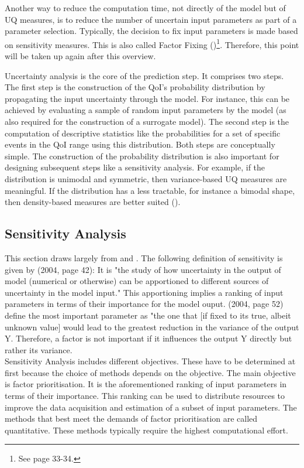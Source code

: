 \documentclass[a4paper,12pt]{article}
\begin{document}
Another way to reduce the computation time, not directly of the model but of UQ measures, is to reduce the number of uncertain input parameters as part of a parameter selection. Typically, the decision to fix input parameters is made based on sensitivity measures. This is also called Factor Fixing (\cite{Saltelli.2008})\footnote{See page 33-34.}. Therefore, this point will be taken up again after this overview.

Uncertainty analysis is the core of the prediction step. It comprises two steps. The first step is the  construction of the QoI's probability distribution by propagating the input uncertainty through the model. For instance, this can be achieved by evaluating a sample of random input parameters by the model (as also required for the construction of a surrogate model). The second step is the computation of descriptive statistics like the probabilities for a set of specific events in the QoI range using this distribution. Both steps are conceptually simple. The construction of the probability distribution is also important for designing subsequent steps like a sensitivity analysis. For example, if the distribution is unimodal and symmetric, then variance-based UQ measures are meaningful. If the distribution has a less tractable, for instance a bimodal shape, then density-based measures are better suited (\cite{plischke2013global}).


\subsection{Sensitivity Analysis}


This section draws largely from \cite{Saltelli.2004} and \cite{Saltelli.2004}.
The following definition of sensitivity is given by \citeauthor{Saltelli.2004} (2004, page 42): It is "the study of how uncertainty in the output of model (numerical or otherwise) can be apportioned to different sources of uncertainty in the model input." This apportioning implies a ranking of input parameters in terms of their importance for the model ouput. \citeauthor{Saltelli.2004} (2004, page 52) define the most important parameter as "the one that [if fixed to its true, albeit unknown value]
would lead to the greatest reduction in the variance of the output Y. Therefore, a factor is not important if it influences the output Y directly but rather its variance.\\

\noindent
Sensitivity Analysis includes different objectives. These have to be determined at first because the choice of methods depends on the objective. The main objective is factor prioritisation. It is the aforementioned ranking of input parameters in terms of their importance. This ranking can be used to distribute resources to improve the data acquisition and estimation of a subset of input parameters. The methods that best meet the demands of factor prioritisation are called quantitative. These methods typically require the highest computational effort.\\
\end{document}
